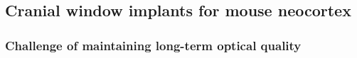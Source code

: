 \subsection{Cranial window implants for mouse neocortex}
\subsubsection{Challenge of maintaining long-term optical quality}